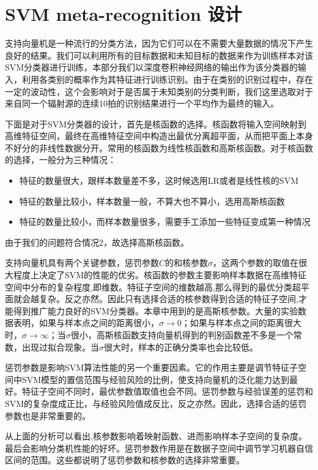 \section{SVM meta-recognition 设计}

支持向量机是一种流行的分类方法，因为它们可以在不需要大量数据的情况下产生良好的结果。我们可以利用所有的目标数据和未知目标的数据来作为训练样本对该SVM分类器进行训练，本部分我们以深度卷积神经网络的输出作为该分类器的输入，利用各类别的概率作为其特征进行训练识别。由于在类别的识别过程中，存在一定的波动性，这个会影响对于是否属于未知类别的分类判断，我们这里选取对于来自同一个辐射源的连续10拍的识别结果进行一个平均作为最终的输入。

下面是对于SVM分类器的设计，首先是核函数的选择。核函数将输入空间映射到高维特征空间，最终在高维特征空间中构造出最优分离超平面，从而把平面上本身不好分的非线性数据分开。常用的核函数为线性核函数和高斯核函数。对于核函数的选择，一般分为三种情况：
\begin{itemize}
	\item  特征的数量很大，跟样本数量差不多，这时候选用LR或者是线性核的SVM
	\item  特征的数量比较小，样本数量一般，不算大也不算小，选用高斯核函数
	\item  特征的数量比较小，而样本数量很多，需要手工添加一些特征变成第一种情况
\end{itemize}
由于我们的问题符合情况2，故选择高斯核函数。

支持向量机具有两个关键参数，惩罚参数$C$的和核参数$\sigma$，这两个参数的取值在很大程度上决定了SVM的性能的优劣。核函数的参数主要影响样本数据在高维特征空间中分布的复杂程度,即维数。特征子空间的维数越高,那么得到的最优分类超平面就会越复杂。反之亦然。因此只有选择合适的核参数得到合适的特征子空间,才能得到推广能力良好的SVM分类器。本章中用到的是高斯核参数。大量的实验数据表明，如果与样本点之间的距离很小，$\sigma \rightarrow 0$；如果与样本点之间的距离很大时，$\sigma \rightarrow \infty$；当$\sigma$很小，高斯核函数支持向量机得到的判别函数差不多是一个常数，出现过拟合现象。当$\sigma$很大时，样本的正确分类率也会比较低。

惩罚参数是影响SVM算法性能的另一个重要因素。它的作用主要是调节特征子空间中SVM模型的置信范围与经验风险的比例，使支持向量机的泛化能力达到最好。特征子空间不同时，最优参数值取值也会不同。惩罚参数与经验误差的惩罚和SVM的复杂度成正比，与经验风险值成反比，反之亦然。因此，选择合适的惩罚参数也是非常重要的。

从上面的分析可以看出,核参数影响着映射函数、进而影响样本子空间的复杂度。最后会影响分类机性能的好坏。惩罚参数作用是在数据子空间中调节学习机器自信区间的范围。这些都说明了惩罚参数和核参数的选择非常重要。
